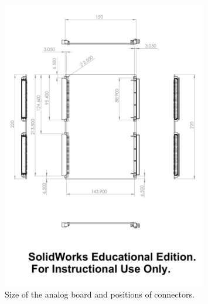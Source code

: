 \documentclass[a4paper]{article}
\begin{document}
\begin{figure}[h]
    \begin{center}
        \includegraphics[width=0.8\textwidth]{imgs/Amplifier_Mod_2}
        \caption{Size of the analog board and positions of connectors.}
        \label{fig:analogboardsize}
    \end{center}
\end{figure}
\end{document}
